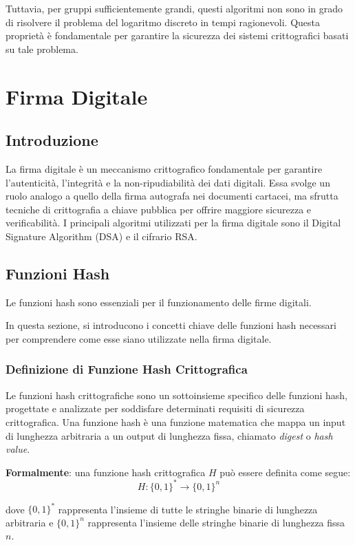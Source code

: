 \documentclass[a4paper,12pt]{report}
\begin{document}
Tuttavia, per gruppi sufficientemente grandi, questi algoritmi non sono in grado di risolvere il problema del logaritmo discreto in tempi ragionevoli. Questa proprietà è fondamentale per garantire la sicurezza dei sistemi crittografici basati su tale problema.
%
%
%
%
%
%
%
%
%
%
%
%
%
%

%
%
%
%
%
%
%
%
%
%
%
%
\chapter{Firma Digitale}

\section{Introduzione}
La firma digitale è un meccanismo crittografico fondamentale per garantire l'autenticità, l'integrità e la non-ripudiabilità dei dati digitali. Essa svolge un ruolo analogo a quello della firma autografa nei documenti cartacei, ma sfrutta tecniche di crittografia a chiave pubblica per offrire maggiore sicurezza e verificabilità. I principali algoritmi utilizzati per la firma digitale sono il Digital Signature Algorithm (DSA) e il cifrario RSA.
\section{Funzioni Hash}
Le funzioni hash sono essenziali per il funzionamento delle firme digitali.

In questa sezione, si introducono i concetti chiave delle funzioni hash necessari per comprendere come esse siano utilizzate nella firma digitale.

\subsection*{Definizione di Funzione Hash Crittografica}
Le funzioni hash crittografiche sono un sottoinsieme specifico delle funzioni hash, progettate e analizzate per soddisfare determinati requisiti di sicurezza crittografica. 
Una funzione hash è una funzione matematica che mappa un input di lunghezza arbitraria a un output di lunghezza fissa, chiamato \textit{digest} o \textit{hash value}.

\textbf{Formalmente}: una funzione hash crittografica $H$ può essere definita come segue:
\[H: \{0,1\}^* \rightarrow \{0,1\}^n\]

dove $\{0,1\}^*$ rappresenta l'insieme di tutte le stringhe binarie di lunghezza arbitraria e $\{0,1\}^n$ rappresenta l'insieme delle stringhe binarie di lunghezza fissa $n$.
\end{document}

